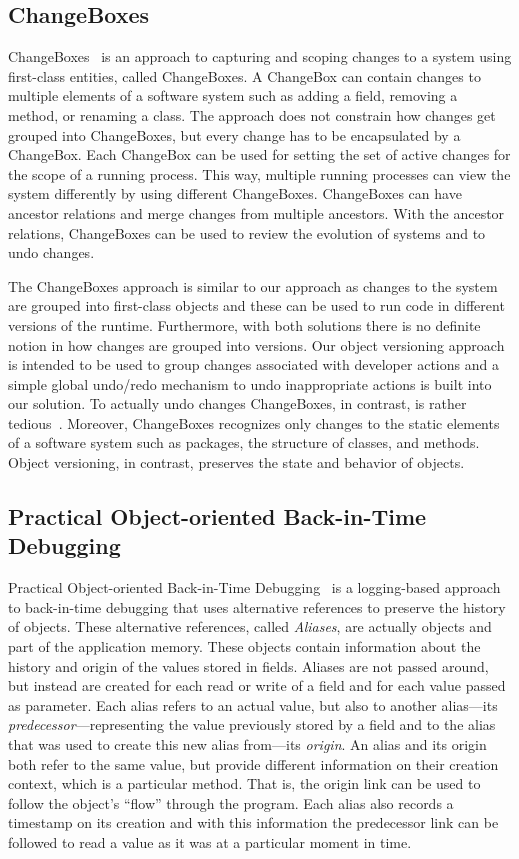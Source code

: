 \subsection{ChangeBoxes}

ChangeBoxes~\cite{Denker2007EEC} is an approach to capturing and scoping changes to a system using first-class entities, called ChangeBoxes.
A ChangeBox can contain changes to multiple elements of a software system such as adding a field, removing a method, or renaming a class.
The approach does not constrain how changes get grouped into ChangeBoxes, but every change has to be encapsulated by a ChangeBox.
Each ChangeBox can be used for setting the set of active changes for the scope of a running process.
This way, multiple running processes can view the system differently by using different ChangeBoxes.
ChangeBoxes can have ancestor relations and merge changes from multiple ancestors.
With the ancestor relations, ChangeBoxes can be used to review the evolution of systems and to undo changes.

The ChangeBoxes approach is similar to our approach as changes to the system are grouped into first-class objects and these can be used to run code in different versions of the runtime.
Furthermore, with both solutions there is no definite notion in how changes are grouped into versions.
Our object versioning approach is intended to be used to group changes associated with developer actions and a simple global undo/redo mechanism to undo inappropriate actions is built into our solution.
To actually undo changes ChangeBoxes, in contrast, is rather tedious~\cite{Steinert2012COE}.
Moreover, ChangeBoxes recognizes only changes to the static elements of a software system such as packages, the structure of classes, and methods.
Object versioning, in contrast, preserves the state and behavior of objects.


\subsection{Practical Object-oriented Back-in-Time Debugging}

Practical Object-oriented Back-in-Time Debugging~\cite{Lienhard2008POB} is a logging-based approach to back-in-time debugging that uses alternative references to preserve the history of objects.
These alternative references, called \emph{Aliases}, are actually objects and part of the application memory.
These objects contain information about the history and origin of the values stored in fields.
Aliases are not passed around, but instead are created for each read or write of a field and for each value passed as parameter.
Each alias refers to an actual value, but also to another alias---its \emph{predecessor}---representing the value previously stored by a field and to the alias that was used to create this new alias from---its \emph{origin}.
An alias and its origin both refer to the same value, but provide different information on their creation context, which is a particular method.
That is, the origin link can be used to follow the object's ``flow'' through the program.
Each alias also records a timestamp on its creation and with this information the predecessor link can be followed to read a value as it was at a particular moment in time.

